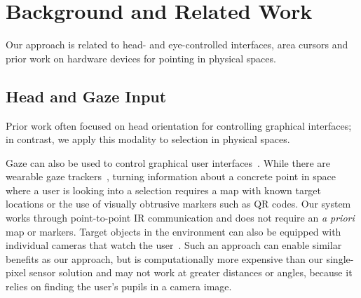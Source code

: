 \section{Background and Related Work}
Our approach is related to head- and eye-controlled interfaces, area cursors and prior work on hardware devices for pointing in physical spaces.

\subsection{Head and Gaze Input}
%
%
Prior work often focused on head orientation for controlling graphical interfaces; in contrast, we apply this modality to selection in physical spaces.

Gaze can also be used to control graphical user interfaces~\cite{kumar2007eyepoint}. While there are wearable gaze trackers~\cite{bulling2009wearable}, turning information about a concrete point in space where a user is looking into a selection requires a map with known target locations or the use of visually obtrusive markers such as QR codes. 
Our system works through point-to-point IR communication and does not require an {\em a priori} map or markers. Target objects in the environment can also be equipped with individual cameras that watch the user~\cite{smith2013gaze,vertegaal2005media}. Such an approach can enable similar benefits as our approach, but is computationally more expensive than our single-pixel sensor solution and may not work at greater distances or angles, because it relies on finding the user's pupils in a camera image.


